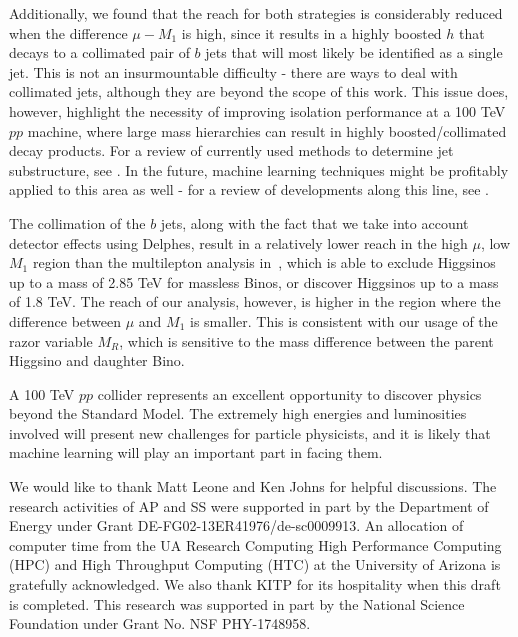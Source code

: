 \documentclass[a4paper,11pt]{article}
\begin{document}
Additionally, we found that the reach for both strategies is considerably
reduced when the difference $ \mu-M_1$ is high, since it results in a highly
boosted $h$ that decays to a collimated pair of $b$ jets that will most likely be
identified as a single jet. This is not an insurmountable difficulty - there are
ways to deal with collimated jets, although they are beyond the scope of this
work. This issue does, however, highlight the necessity of improving isolation
performance at a 100 TeV $pp$ machine, where large mass hierarchies can result in
highly boosted/collimated decay products. For a review of currently used methods
to determine jet substructure, see \cite{Shelton:2013an}. In the future,
machine learning techniques might be profitably applied to this area as well -
for a review of developments along this line, see \cite{Schwartzman:2016jqu}. 

The collimation of the $b$ jets, along with the fact that we take into account
detector effects using Delphes, result in a relatively lower reach in the high
$\mu$, low $M_1$ region than the multilepton analysis in~\cite{Gori:2014oua},
which is able to exclude Higgsinos up to a mass of 2.85 TeV for massless Binos,
or discover Higgsinos up to a mass of 1.8 TeV.   The reach of our analysis,
however,  is higher in the region where the difference between $\mu$ and $M_1$
is smaller. This is consistent with our usage of the razor variable $M_R$,
which is sensitive to the mass difference between the parent Higgsino and
daughter Bino.

A 100 TeV $pp$ collider represents an excellent opportunity to discover
physics beyond the Standard Model. The extremely high energies and luminosities
involved will present new challenges for particle physicists, and it is likely
that machine learning will play an important part in facing them. 
  
\acknowledgments

We would like to thank Matt Leone and Ken Johns for helpful discussions.  The
research activities of AP and SS were supported in part by the Department of
Energy under Grant DE-FG02-13ER41976/de-sc0009913. An allocation of computer
time from the UA Research Computing High Performance Computing (HPC) and High
Throughput Computing (HTC) at the University of Arizona is gratefully
acknowledged.  We also thank KITP for its hospitality when this draft is completed.  This research was supported in part by the National Science Foundation under Grant No. NSF PHY-1748958.


\end{document}
